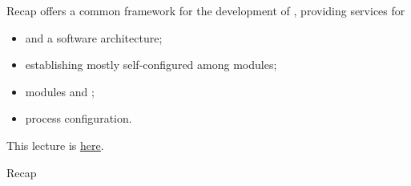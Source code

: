 
\begin{frame}{Recap}
  \justifying
	 offers a common framework for the development of , providing services for
	\begin{itemize}
		\item {} and  a  software architecture;
		\item establishing mostly self-configured  among modules;
		\item modules  and ;
		\item process  configuration.
	\end{itemize}
	\bigskip
	This lecture is \href{https://github.com/robmasocco/DAFN26_Robotics_9}{\color{blue}\underline{here}}.
\end{frame}
\begin{frame}{Recap}
	\begin{alertblock}{}
		\centering
	\end{alertblock}
\end{frame}
